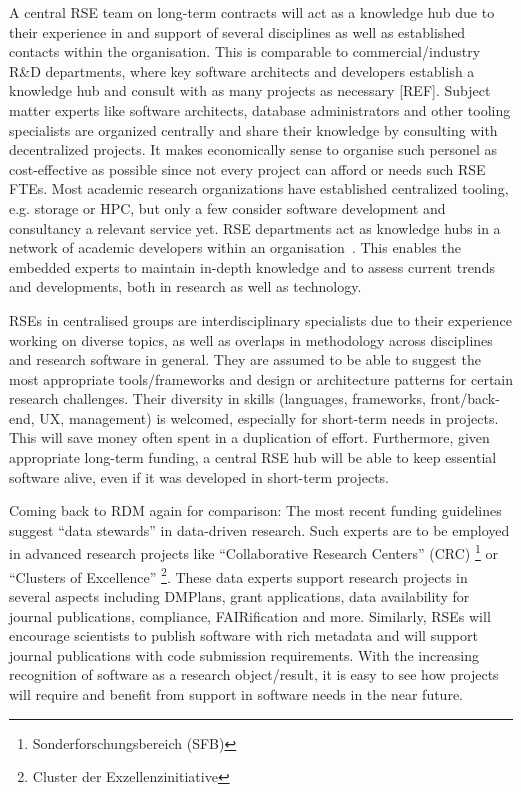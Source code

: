\documentclass[a4paper]{article}
\begin{document}
A central RSE team on long-term contracts will act as a knowledge hub due to their experience in and support of several disciplines as well as established contacts within the organisation.
This is comparable to commercial/industry R\&D departments, where key software architects and developers establish a knowledge hub and consult with as many projects as necessary [REF].
Subject matter experts like software architects, database administrators and other tooling specialists are organized centrally and share their knowledge by consulting with decentralized projects. It makes economically sense to organise such personel as cost-effective as possible since not every project can afford or needs such RSE FTEs. 
Most academic research organizations have established centralized tooling, e.g. storage or HPC, but only a few consider software development and consultancy a relevant service yet. 
RSE departments act as knowledge hubs in a network of academic developers within an organisation~\autocite{Elsholz2006}.
This enables the embedded experts to maintain in-depth knowledge and to assess current trends and developments, both in research as well as technology.

RSEs in centralised groups are interdisciplinary specialists due to their experience working on diverse topics, as well as overlaps in methodology across disciplines and research software in general.
They are assumed to be able to suggest the most appropriate tools/frameworks and design or architecture patterns for certain research challenges.
Their diversity in skills (languages, frameworks, front/back-end, UX, management) is welcomed, especially for short-term needs in projects.
This will save money often spent in a duplication of effort.
Furthermore, given appropriate long-term funding, a central RSE hub will be able to keep essential software alive, even if it was developed in short-term projects.


Coming back to RDM again for comparison: The most recent funding guidelines suggest “data stewards” in data-driven research.
Such experts are to be employed in advanced research projects like “Collaborative Research Centers” (CRC) \footnote{Sonderforschungsbereich (SFB)} or “Clusters of Excellence”
\footnote{Cluster der Exzellenzinitiative}.
These data experts support research projects in several aspects including DMPlans, grant applications, data availability for journal publications, compliance, FAIRification and more.
Similarly, RSEs will encourage scientists to publish software with rich metadata and will support journal publications with code submission requirements.
With the increasing recognition of software as a research object/result, it is easy to see how projects will require and benefit from support in software needs in the near future.
\end{document}
